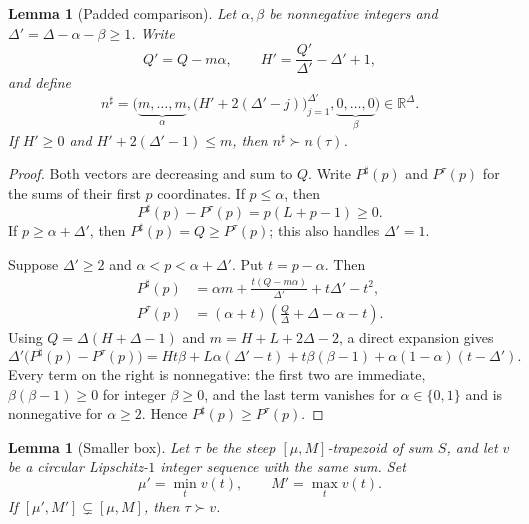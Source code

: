 \documentclass[11pt]{article}
\newtheorem{lemma}[theorem]{Lemma}
\theoremstyle{definition}
\newcommand{\R}{\mathbb{R}}
\begin{document}
\begin{lemma}[Padded comparison]\label{lem:padded}
Let $\alpha,\beta$ be nonnegative integers and $\Delta'=\Delta-\alpha-\beta\ge1$. Write
\[
Q'=Q-m\alpha,
\qquad
H'=\frac{Q'}{\Delta'}-\Delta'+1,
\]
and define
\[
n^\sharp
=\bigl(
\underbrace{m,\dots,m}_{\alpha},
\bigl(H'+2(\Delta'-j)\bigr)_{j=1}^{\Delta'},
\underbrace{0,\dots,0}_{\beta}
\bigr)\in\R^\Delta.
\]
If $H'\ge0$ and $H'+2(\Delta'-1)\le m$, then $n^\sharp\succ n(\tau)$.
\end{lemma}

\begin{proof}
Both vectors are decreasing and sum to $Q$. Write $P^\sharp(p)$ and $P^\tau(p)$ for the sums of their first $p$ coordinates. If $p\le \alpha$, then
\[
P^\sharp(p)-P^\tau(p)=p(L+p-1)\ge0.
\]
If $p\ge \alpha+\Delta'$, then $P^\sharp(p)=Q\ge P^\tau(p)$; this also handles $\Delta'=1$.

Suppose $\Delta'\ge2$ and $\alpha<p<\alpha+\Delta'$. Put $t=p-\alpha$. Then
\begin{align*}
P^\sharp(p)
&=\alpha m+\frac{t(Q-m\alpha)}{\Delta'}+t\Delta'-t^2,\\
P^\tau(p)
&=(\alpha+t)\left(\frac{Q}{\Delta}+\Delta-\alpha-t\right).
\end{align*}
Using $Q=\Delta(H+\Delta-1)$ and $m=H+L+2\Delta-2$, a direct expansion gives
\begin{equation}\label{eq:E}
\Delta'\bigl(P^\sharp(p)-P^\tau(p)\bigr)
=Ht\beta+L\alpha(\Delta'-t)+t\beta(\beta-1)+\alpha(1-\alpha)(t-\Delta').
\end{equation}
Every term on the right is nonnegative: the first two are immediate, $\beta(\beta-1)\ge0$ for integer $\beta\ge0$, and the last term vanishes for $\alpha\in\{0,1\}$ and is nonnegative for $\alpha\ge2$. Hence $P^\sharp(p)\ge P^\tau(p)$.
\end{proof}

\begin{lemma}[Smaller box]\label{lem:smaller-box}
Let $\tau$ be the steep $[\mu,M]$-trapezoid of sum $S$, and let $v$ be a circular Lipschitz-$1$ integer sequence with the same sum. Set
\[
\mu'=\min_tv(t),
\qquad
M'=\max_tv(t).
\]
If $[\mu',M']\subsetneq[\mu,M]$, then $\tau\succ v$.
\end{lemma}
\end{document}
